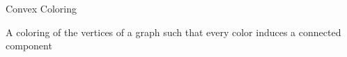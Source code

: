 \begin{frame}{Convex Coloring}

A coloring of the vertices of a graph such that every color induces a connected component



\end{frame}
